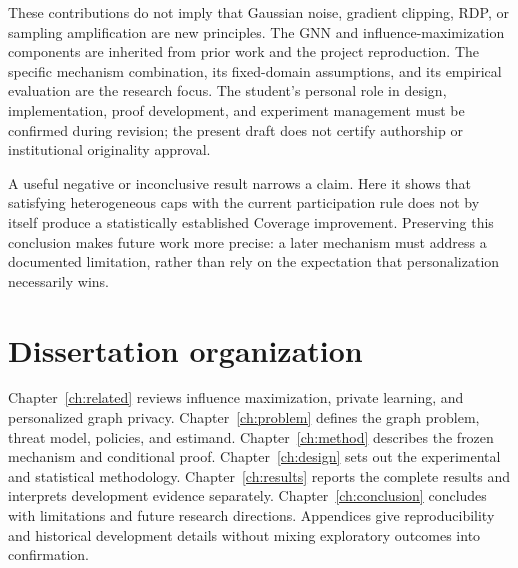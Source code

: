 These contributions do not imply that Gaussian noise, gradient clipping, RDP, or sampling amplification are new principles. The GNN and influence-maximization components are inherited from prior work and the project reproduction. The specific mechanism combination, its fixed-domain assumptions, and its empirical evaluation are the research focus. The student's personal role in design, implementation, proof development, and experiment management must be confirmed during revision; the present draft does not certify authorship or institutional originality approval.

A useful negative or inconclusive result narrows a claim. Here it shows that satisfying heterogeneous caps with the current participation rule does not by itself produce a statistically established Coverage improvement. Preserving this conclusion makes future work more precise: a later mechanism must address a documented limitation, rather than rely on the expectation that personalization necessarily wins.

\section{Dissertation organization}
Chapter~\ref{ch:related} reviews influence maximization, private learning, and personalized graph privacy. Chapter~\ref{ch:problem} defines the graph problem, threat model, policies, and estimand. Chapter~\ref{ch:method} describes the frozen mechanism and conditional proof. Chapter~\ref{ch:design} sets out the experimental and statistical methodology. Chapter~\ref{ch:results} reports the complete results and interprets development evidence separately. Chapter~\ref{ch:conclusion} concludes with limitations and future research directions. Appendices give reproducibility and historical development details without mixing exploratory outcomes into confirmation.
